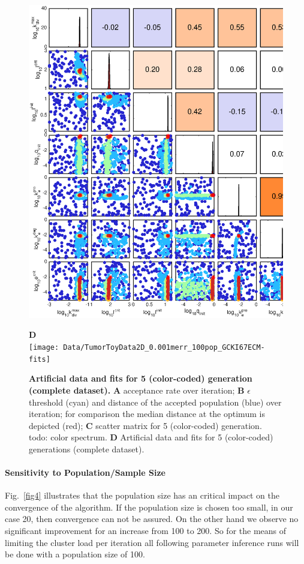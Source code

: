 \documentclass[10pt,letterpaper]{article}
\begin{document}
\begin{figure}[htbp]
\begin{minipage}[t]{0.66\textwidth}
\includegraphics[width=\textwidth]{Data/TumorToyData2D_0.001merr_100pop_GCKI67ECM-scatterPlotMatrix}
\end{minipage}
\textbf{D}\\
\texttt{[image: Data/TumorToyData2D\_0.001merr\_100pop\_GCKI67ECM-fits]}
\caption{{\bf Artificial data and fits for 5 (color-coded) generation (complete dataset).}
\textbf{A}  acceptance rate over iteration; \textbf{B} $\epsilon$ threshold (cyan) and distance of the accepted population (blue) over iteration; for comparison the median distance at the optimum is depicted (red); \textbf{C} scatter matrix for 5 (color-coded) generation. todo: color spectrum. \textbf{D} Artificial data and fits for 5 (color-coded) generations (complete dataset).}
\label{fig3}
\end{figure}


\paragraph{Sensitivity to Population/Sample Size}
Fig.~\ref{fig4} illustrates that the population size has an critical impact on the convergence of the algorithm. If the population size is chosen too small, in our case 20, then convergence can not be assured. On the other hand we observe no significant improvement for an increase from 100 to 200. So for the means of limiting the cluster load per iteration all following parameter inference runs will be done with a population size of 100.
\end{document}
